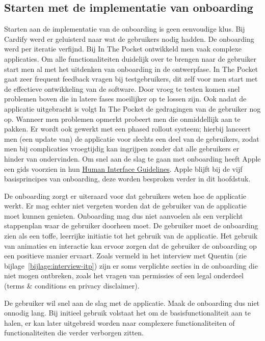 \subsection{Starten met de implementatie van onboarding}
\label{sec:onboarding:start}

Starten aan de implementatie van de onboarding is geen eenvoudige klus. Bij Cardify werd er geluisterd naar wat de gebruikers nodig hadden. De onboarding werd per iteratie verfijnd. Bij In The Pocket ontwikkeld men vaak complexe applicaties. Om alle functionaliteiten duidelijk over te brengen naar de gebruiker start men al met het uitdenken van onboarding in de ontwerpfase. In The Pocket gaat zeer frequent feedback vragen bij testgebruikers, dit zelf voor men start met de effectieve ontwikkeling van de software. Door vroeg te testen komen snel problemen boven die in latere fases moeilijker op te lossen zijn. Ook nadat de applicatie uitgebracht is volgt In The Pocket de gedragingen van de gebruiker nog op. Wanneer men problemen opmerkt probeert men die onmiddellijk aan te pakken. Er wordt ook gewerkt met een phased rollout systeem; hierbij lanceert men (een update van) de applicatie voor slechts een deel van de gebruikers, zodat men bij complicaties vroegtijdig kan ingrijpen zonder dat alle gebruikers er hinder van ondervinden. Om snel aan de slag te gaan met onboarding heeft Apple een gids voorzien in hun \href{https://developer.apple.com/design/human-interface-guidelines/ios/app-architecture/onboarding/}{Human Interface Guidelines}. Apple blijft bij de vijf basisprincipes van onboarding, deze worden besproken verder in dit hoofdstuk.

De onboarding zorgt er uiteraard voor dat gebruikers weten hoe de applicatie werkt. Er mag echter niet vergeten worden dat de gebruiker van de applicatie moet kunnen genieten. Onboarding mag dus niet aanvoelen als een verplicht stappenplan waar de gebruiker doorheen moet. De gebruiker moet de onboarding zien als een toffe, leerrijke initiatie tot het gebruik van de applicatie. Het gebruik van animaties en interactie kan ervoor zorgen dat de gebruiker de onboarding op een positieve manier ervaart. Zoals vermeld in het interview met Quentin (zie bijlage~\ref{bijlage:interview-itp}) zijn er soms verplichte secties in de onboarding die niet mogen ontbreken, zoals het vragen van permissies of een legal onderdeel (terms \& conditions en privacy disclaimer).

De gebruiker wil snel aan de slag met de applicatie. Maak de onboarding dus niet onnodig lang. Bij initieel gebruik volstaat het om de basisfunctionaliteit aan te halen, er kan later uitgebreid worden naar complexere functionaliteiten of functionaliteiten die verder verborgen zitten.

